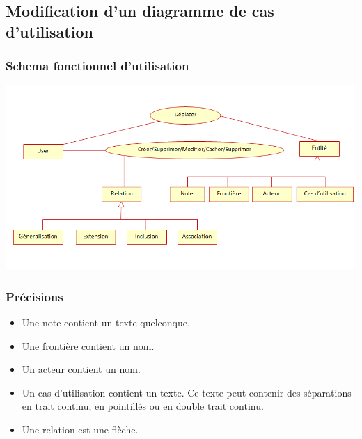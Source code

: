 \documentclass[hidelinks, 10pt,a4paper]{article}
\begin{document}
\newpage

\subsection{Modification d’un diagramme de cas d’utilisation}
\subsubsection{Schema fonctionnel d’utilisation}
\begin{center}
    \includegraphics[width=14cm]{imgSTB/E-R-UseCase.png}
\end{center}
\subsubsection{Précisions}
\begin{itemize}
 \item Une note contient un texte quelconque.
 \item Une frontière contient un nom.
 \item Un acteur contient un nom. 
 \item Un cas d’utilisation contient un texte. Ce texte peut contenir des séparations en trait continu, en pointillés ou en double trait continu.
 \item Une relation est une flèche.
\end{itemize}
\end{document}
